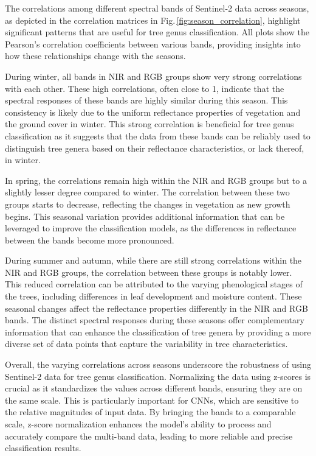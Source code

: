 The correlations among different spectral bands of Sentinel-2 data across seasons, as depicted in the correlation matrices in Fig.\,\ref{fig:season_correlation}, highlight significant patterns that are useful for tree genus classification. All plots show the Pearson's correlation coefficients between various bands, providing insights into how these relationships change with the seasons.

During winter, all bands in NIR and RGB groups show very strong correlations with each other. These high correlations, often close to 1, indicate that the spectral responses of these bands are highly similar during this season. This consistency is likely due to the uniform reflectance properties of vegetation and the ground cover in winter. This strong correlation is beneficial for tree genus classification as it suggests that the data from these bands can be reliably used to distinguish tree genera based on their reflectance characteristics, or lack thereof, in winter.

In spring, the correlations remain high within the NIR and RGB groups but to a slightly lesser degree compared to winter. The correlation between these two groups starts to decrease, reflecting the changes in vegetation as new growth begins. This seasonal variation provides additional information that can be leveraged to improve the classification models, as the differences in reflectance between the bands become more pronounced.

During summer and autumn, while there are still strong correlations within the NIR and RGB groups, the correlation between these groups is notably lower. This reduced correlation can be attributed to the varying phenological stages of the trees, including differences in leaf development and moisture content. These seasonal changes affect the reflectance properties differently in the NIR and RGB bands. The distinct spectral responses during these seasons offer complementary information that can enhance the classification of tree genera by providing a more diverse set of data points that capture the variability in tree characteristics.

Overall, the varying correlations across seasons underscore the robustness of using Sentinel-2 data for tree genus classification. Normalizing the data using z-scores is crucial as it standardizes the values across different bands, ensuring they are on the same scale. This is particularly important for CNNs, which are sensitive to the relative magnitudes of input data. By bringing the bands to a comparable scale, z-score normalization enhances the model's ability to process and accurately compare the multi-band data, leading to more reliable and precise classification results.

